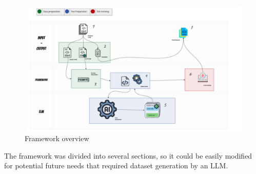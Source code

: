 \begin{figure}[H]
    \centering
    \includegraphics[width=1\textwidth]{img/framework/overview.pdf}
    \caption{Framework overview}
    \label{fig:framework overview}
\end{figure}


The framework was divided into several sections, so it could be easily modified for 
potential future needs that required dataset generation by an LLM.

